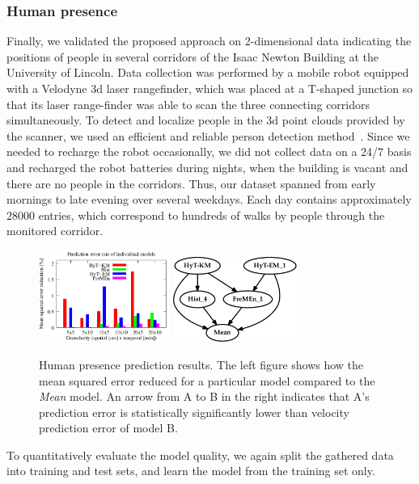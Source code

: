 \subsubsection{Human presence}

Finally, we validated the proposed approach on 2-dimensional data indicating the positions of people in several corridors of the Isaac Newton Building at the University of Lincoln.
Data collection was performed by a mobile robot equipped with a Velodyne 3d laser rangefinder, which was placed at a T-shaped junction so that its laser range-finder was able to scan the three connecting corridors simultaneously.
To detect and localize people in the 3d point clouds provided by the scanner, we used an efficient and reliable person detection method~\cite{yan2017online}.
Since we needed to recharge the robot occasionally, we did not collect data on a 24/7 basis and recharged the robot batteries during nights, when the building is vacant and there are no people in the corridors.
Thus, our dataset spanned from early mornings to late evening over several weekdays.
Each day contains approximately $28000$ entries, which correspond to hundreds of walks by people through the monitored corridor. 
%
\begin{figure}[!ht]
   \begin{center}
   \hfill
      \includegraphics[height=3.0cm]{fig/ped_graph}
      \hfill
      \includegraphics[height=2.8cm]{fig/ped_stat}
      \hfill
      \caption{Human presence prediction results. The left figure shows how the mean squared error reduced for a particular model compared to the \textit{Mean} model.
An arrow from A to B in the right indicates that A's prediction error is statistically significantly lower than velocity prediction error of model B.\label{fig:pedestrians}}
   \end{center}
\end{figure}
%
To quantitatively evaluate the model quality, we again split the gathered data into training and test sets, and learn the model from the training set only.
